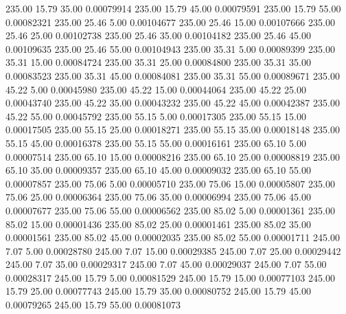     235.00     15.79     35.00     0.00079914
    235.00     15.79     45.00     0.00079591
    235.00     15.79     55.00     0.00082321
    235.00     25.46      5.00     0.00104677
    235.00     25.46     15.00     0.00107666
    235.00     25.46     25.00     0.00102738
    235.00     25.46     35.00     0.00104182
    235.00     25.46     45.00     0.00109635
    235.00     25.46     55.00     0.00104943
    235.00     35.31      5.00     0.00089399
    235.00     35.31     15.00     0.00084724
    235.00     35.31     25.00     0.00084800
    235.00     35.31     35.00     0.00083523
    235.00     35.31     45.00     0.00084081
    235.00     35.31     55.00     0.00089671
    235.00     45.22      5.00     0.00045980
    235.00     45.22     15.00     0.00044064
    235.00     45.22     25.00     0.00043740
    235.00     45.22     35.00     0.00043232
    235.00     45.22     45.00     0.00042387
    235.00     45.22     55.00     0.00045792
    235.00     55.15      5.00     0.00017305
    235.00     55.15     15.00     0.00017505
    235.00     55.15     25.00     0.00018271
    235.00     55.15     35.00     0.00018148
    235.00     55.15     45.00     0.00016378
    235.00     55.15     55.00     0.00016161
    235.00     65.10      5.00     0.00007514
    235.00     65.10     15.00     0.00008216
    235.00     65.10     25.00     0.00008819
    235.00     65.10     35.00     0.00009357
    235.00     65.10     45.00     0.00009032
    235.00     65.10     55.00     0.00007857
    235.00     75.06      5.00     0.00005710
    235.00     75.06     15.00     0.00005807
    235.00     75.06     25.00     0.00006364
    235.00     75.06     35.00     0.00006994
    235.00     75.06     45.00     0.00007677
    235.00     75.06     55.00     0.00006562
    235.00     85.02      5.00     0.00001361
    235.00     85.02     15.00     0.00001436
    235.00     85.02     25.00     0.00001461
    235.00     85.02     35.00     0.00001561
    235.00     85.02     45.00     0.00002035
    235.00     85.02     55.00     0.00001711
    245.00      7.07      5.00     0.00028780
    245.00      7.07     15.00     0.00029385
    245.00      7.07     25.00     0.00029442
    245.00      7.07     35.00     0.00029317
    245.00      7.07     45.00     0.00029037
    245.00      7.07     55.00     0.00028317
    245.00     15.79      5.00     0.00081529
    245.00     15.79     15.00     0.00077103
    245.00     15.79     25.00     0.00077743
    245.00     15.79     35.00     0.00080752
    245.00     15.79     45.00     0.00079265
    245.00     15.79     55.00     0.00081073
